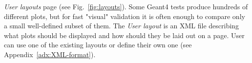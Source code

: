 \textit{User layouts} page (see Fig.~\ref{fig:layouts}). Some Geant4 tests produce hundreds of different plots, but for fast "visual" validation it is often enough to compare only a small well-defined subset of them. The \textit{User layout} is an XML file describing what plots should be displayed and how should they be laid out on a page. User can use one of the existing layouts or define their own one (see Appendix~\ref{adx:XML-format}).
